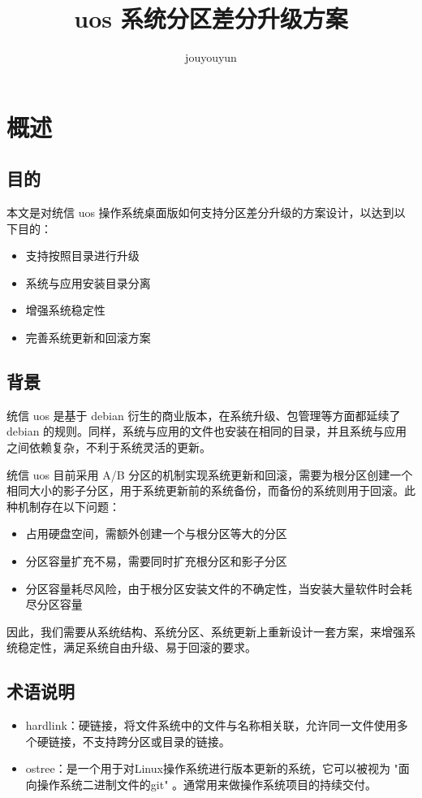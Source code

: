 \documentclass{utart}
\title{uos 系统分区差分升级方案}
\author{jouyouyun}
\begin{document}

\utMakeTOC

\section{概述}
\subsection{目的}
本文是对统信 uos 操作系统桌面版如何支持分区差分升级的方案设计，以达到以下目的：
\begin{itemize}[leftmargin=4em]
\item 支持按照目录进行升级
\item 系统与应用安装目录分离
\item 增强系统稳定性
\item 完善系统更新和回滚方案
\end{itemize}

\subsection{背景}
统信 uos 是基于 debian 衍生的商业版本，在系统升级、包管理等方面都延续了 debian 的规则。同样，系统与应用的文件也安装在相同的目录，并且系统与应用之间依赖复杂，不利于系统灵活的更新。

统信 uos 目前采用 A/B 分区的机制实现系统更新和回滚，需要为根分区创建一个相同大小的影子分区，用于系统更新前的系统备份，而备份的系统则用于回滚。此种机制存在以下问题：
\begin{itemize}[leftmargin=4em]
\item 占用硬盘空间，需额外创建一个与根分区等大的分区
\item 分区容量扩充不易，需要同时扩充根分区和影子分区
\item 分区容量耗尽风险，由于根分区安装文件的不确定性，当安装大量软件时会耗尽分区容量
\end{itemize}

因此，我们需要从系统结构、系统分区、系统更新上重新设计一套方案，来增强系统稳定性，满足系统自由升级、易于回滚的要求。

\subsection{术语说明}
\begin{itemize}[leftmargin=4em]
\item hardlink：硬链接，将文件系统中的文件与名称相关联，允许同一文件使用多个硬链接，不支持跨分区或目录的链接。
\item ostree：是一个用于对Linux操作系统进行版本更新的系统，它可以被视为 "面向操作系统二进制文件的git" 。通常用来做操作系统项目的持续交付。
\end{itemize}
\end{document}
